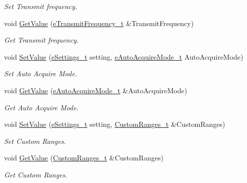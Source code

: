 \begin{DoxyCompactItemize}
\begin{DoxyCompactList}\small\item\em Set Transmit frequency. \end{DoxyCompactList}\item 
void \mbox{\hyperlink{struct_quantum_lib_1_1_setting_data__t_a9e324af6f168fb031af7ea79fee13dc3}{Get\+Value}} (\mbox{\hyperlink{namespace_quantum_lib_af636ea7f14f5a62bfcfc1132c9c78019}{e\+Transmit\+Frequency\+\_\+t}} \&Transmit\+Frequency)
\begin{DoxyCompactList}\small\item\em Get Transmit frequency. \end{DoxyCompactList}\item 
void \mbox{\hyperlink{struct_quantum_lib_1_1_setting_data__t_aca6ac94b7516de5b57f37fe8d8e8190d}{Set\+Value}} (\mbox{\hyperlink{namespace_quantum_lib_acc8124e3e65bca4aa798d03a55e3d54c}{e\+Settings\+\_\+t}} setting, \mbox{\hyperlink{namespace_quantum_lib_ad91dac4bf2ef5d3615cb423383b961d8}{e\+Auto\+Acquire\+Mode\+\_\+t}} Auto\+Acquire\+Mode)
\begin{DoxyCompactList}\small\item\em Set Auto Acquire Mode. \end{DoxyCompactList}\item 
void \mbox{\hyperlink{struct_quantum_lib_1_1_setting_data__t_a6772159d5411ecb08352a3021a983298}{Get\+Value}} (\mbox{\hyperlink{namespace_quantum_lib_ad91dac4bf2ef5d3615cb423383b961d8}{e\+Auto\+Acquire\+Mode\+\_\+t}} \&Auto\+Acquire\+Mode)
\begin{DoxyCompactList}\small\item\em Get Auto Acquire Mode. \end{DoxyCompactList}\item 
void \mbox{\hyperlink{struct_quantum_lib_1_1_setting_data__t_a840c5c09718c7ec1f8e6b8e714558e50}{Set\+Value}} (\mbox{\hyperlink{namespace_quantum_lib_acc8124e3e65bca4aa798d03a55e3d54c}{e\+Settings\+\_\+t}} setting, \mbox{\hyperlink{struct_quantum_lib_1_1_custom_ranges__t}{Custom\+Ranges\+\_\+t}} \&Custom\+Ranges)
\begin{DoxyCompactList}\small\item\em Set Custom Ranges. \end{DoxyCompactList}\item 
void \mbox{\hyperlink{struct_quantum_lib_1_1_setting_data__t_ada56714337dd308a32c70fe184bbe74e}{Get\+Value}} (\mbox{\hyperlink{struct_quantum_lib_1_1_custom_ranges__t}{Custom\+Ranges\+\_\+t}} \&Custom\+Ranges)
\begin{DoxyCompactList}\small\item\em Get Custom Ranges. \end{DoxyCompactList}\item 

\end{DoxyCompactItemize}
